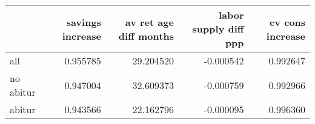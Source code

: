 \begin{tabular}{lrrrr}
\toprule
 & savings increase & av ret age diff months & labor supply diff ppp & cv cons increase \\
\midrule
all & 0.955785 & 29.204520 & -0.000542 & 0.992647 \\
no abitur & 0.947004 & 32.609373 & -0.000759 & 0.992966 \\
abitur & 0.943566 & 22.162796 & -0.000095 & 0.996360 \\
\bottomrule
\end{tabular}
